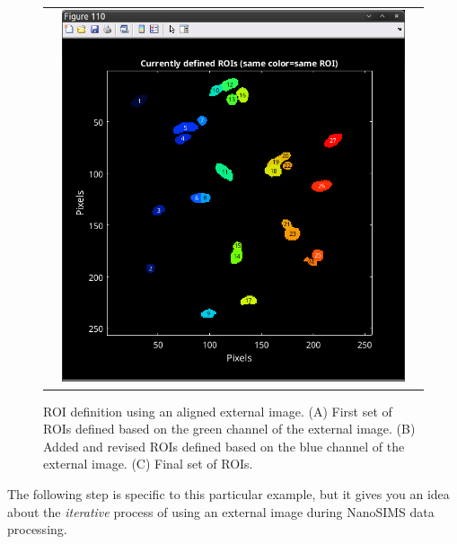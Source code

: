 \begin{figure}[!ht]
\begin{tabular}{c@{\hskip0mm}c@{\hskip0mm}c}
&
\includegraphics[scale=\scf]{figs7/LANS-ext-ROIs3}
\end{tabular}
\caption{\label{fig:LANS-ext-ROIs}%
ROI definition using an aligned external image. (A) First set of ROIs defined based on the green channel of the external image. (B) Added and revised ROIs defined based on the blue channel of the external image. (C) Final set of ROIs.}
\end{figure}

\goldbox{}
The following step is specific to this particular example, but it gives you an idea about the \emph{iterative} process of using an external image during NanoSIMS data processing. 
\tcbe



